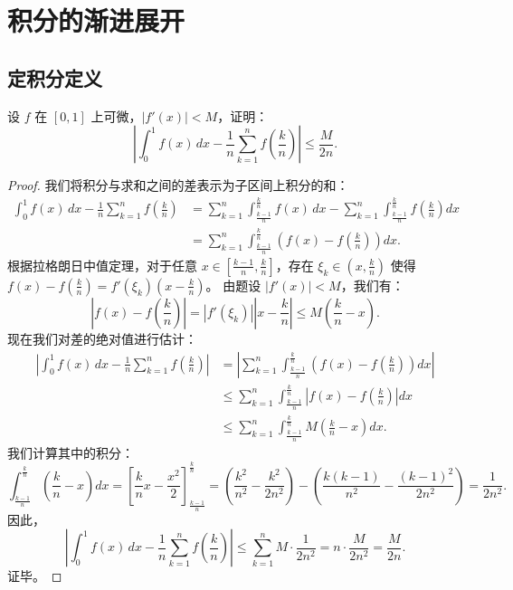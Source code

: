 \documentclass[lang=cn,10pt,thmcnt=section]{elegantbook}
\begin{document}
\section{积分的渐进展开}
\subsection{定积分定义}
\begin{example}
    设 \( f \) 在 \([0,1]\) 上可微，\(\left|f'(x)\right| < M\)，证明：
\[
\left|\int_0^1 f(x) \, dx - \frac{1}{n} \sum_{k=1}^n f\left(\frac{k}{n}\right)\right| \leq \frac{M}{2n}.\]
\end{example}
\begin{proof}
    我们将积分与求和之间的差表示为子区间上积分的和：
    \begin{align*}
        \int_0^1 f(x) \, dx - \frac{1}{n} \sum_{k=1}^n f\left(\frac{k}{n}\right) &= \sum_{k=1}^n \int_{\frac{k-1}{n}}^{\frac{k}{n}} f(x) \, dx - \sum_{k=1}^n \int_{\frac{k-1}{n}}^{\frac{k}{n}} f\left(\frac{k}{n}\right) dx \\
        &= \sum_{k=1}^n \int_{\frac{k-1}{n}}^{\frac{k}{n}} \left( f(x) - f\left(\frac{k}{n}\right) \right) dx.
    \end{align*}
    根据拉格朗日中值定理，对于任意 $x \in [\frac{k-1}{n}, \frac{k}{n}]$，存在 $\xi_k \in (x, \frac{k}{n})$ 使得 $f(x) - f(\frac{k}{n}) = f'(\xi_k)(x-\frac{k}{n})$。
    由题设 $|f'(x)| < M$，我们有：
    \[
    \left| f(x) - f\left(\frac{k}{n}\right) \right| = \left| f'(\xi_k) \right| \left| x - \frac{k}{n} \right| \leq M \left(\frac{k}{n} - x\right).
    \]
    现在我们对差的绝对值进行估计：
    \begin{align*}
        \left|\int_0^1 f(x) \, dx - \frac{1}{n} \sum_{k=1}^n f\left(\frac{k}{n}\right)\right| &= \left|\sum_{k=1}^n \int_{\frac{k-1}{n}}^{\frac{k}{n}} \left( f(x) - f\left(\frac{k}{n}\right) \right) dx\right| \\
        &\leq \sum_{k=1}^n \int_{\frac{k-1}{n}}^{\frac{k}{n}} \left| f(x) - f\left(\frac{k}{n}\right) \right| dx \\
        &\leq \sum_{k=1}^n \int_{\frac{k-1}{n}}^{\frac{k}{n}} M \left(\frac{k}{n} - x\right) dx.
    \end{align*}
    我们计算其中的积分：
    \[
    \int_{\frac{k-1}{n}}^{\frac{k}{n}} \left(\frac{k}{n} - x\right) dx = \left[ \frac{k}{n}x - \frac{x^2}{2} \right]_{\frac{k-1}{n}}^{\frac{k}{n}} = \left(\frac{k^2}{n^2} - \frac{k^2}{2n^2}\right) - \left(\frac{k(k-1)}{n^2} - \frac{(k-1)^2}{2n^2}\right) = \frac{1}{2n^2}.
    \]
    因此，
    \[
    \left|\int_0^1 f(x) \, dx - \frac{1}{n} \sum_{k=1}^n f\left(\frac{k}{n}\right)\right| \leq \sum_{k=1}^n M \cdot \frac{1}{2n^2} = n \cdot \frac{M}{2n^2} = \frac{M}{2n}.
    \]
    证毕。
\end{proof}
\end{document}
